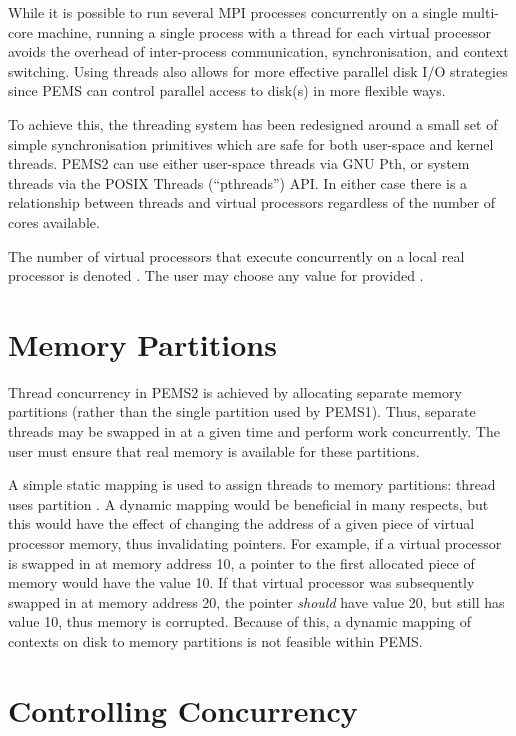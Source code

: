 \documentclass[12pt]{carletoncsthesis}
\begin{document}
While it is possible to run several MPI processes concurrently on a single
multi-core machine, running a single process with a thread for each virtual
processor avoids the overhead of inter-process communication, synchronisation,
and context switching.  Using threads also allows for more effective parallel
disk I/O strategies since PEMS can control parallel access to disk(s) in
more flexible ways.

To achieve this, the threading system has been redesigned around a small
set of simple synchronisation primitives which are safe for both user-space
and kernel threads.  PEMS2 can use either user-space threads via GNU Pth,
or system threads via the POSIX Threads (``pthreads'') API.  In either
case there is a  relationship between threads and virtual processors
regardless of the number of cores available.

The number of virtual processors that execute concurrently on a local real
processor is denoted .  The user may choose any value for  provided
.

\section{Memory Partitions}
\label{partitions}


Thread concurrency in PEMS2 is achieved by allocating  separate memory
partitions (rather than the single partition used by PEMS1).  Thus,
 separate threads may be swapped in at a given time and perform work
concurrently.  The user must ensure that  real memory is available
for these partitions.

A simple static mapping is used to assign threads to memory partitions:
thread  uses partition .  A dynamic mapping would be beneficial
in many respects, but this would have the effect of changing the address
of a given piece of virtual processor memory, thus invalidating pointers.
For example, if a virtual processor is swapped in at memory address 10,
a pointer to the first allocated piece of memory would have the value 10.
If that virtual processor was subsequently swapped in at memory address 20,
the pointer {\em should} have value 20, but still has value 10, thus memory
is corrupted.  Because of this, a dynamic mapping of contexts on disk to
memory partitions is not feasible within PEMS.

\section{Controlling Concurrency}
\end{document}
